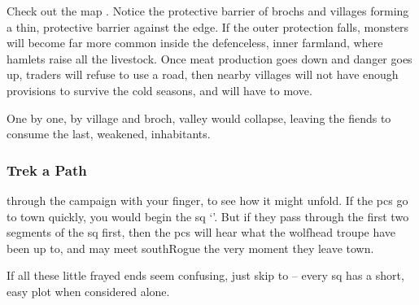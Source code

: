 \begin{multicols}{2}
Check out the map .
Notice the protective barrier of \glspl{broch} and \glspl{village} forming a thin, protective barrier against the \gls{edge}.
If the outer protection falls, \glspl{monster} will become far more common inside the defenceless, inner farmland, where hamlets raise all the livestock.
Once meat production goes down and danger goes up, traders will refuse to use a road, then nearby \glspl{village} will not have enough provisions to survive the cold seasons, and will have to move.

One by one, by \gls{village} and \gls{broch}, \gls{valley} would collapse, leaving the \glspl{fiend} to consume the last, weakened, inhabitants.

\subsubsection{Trek a Path}
through the \gls{campaign} with your finger, to see how it might unfold.
If the \glspl{pc} go to town quickly, you would begin the \gls{sq} `'.
But if they pass through the first two \glspl{segment} of the  \gls{sq} first, then the \glspl{pc} will hear what the \gls{wolfhead} troupe have been up to, and may meet \gls{southRogue} the very moment they leave \gls{town}.

If all these little frayed ends seem confusing, just skip to   -- every \gls{sq} has a short, easy plot when considered alone.




\renewcommand\csComments{
  \mapCircle{16}{76}{1.7}{Dyson_Logos/bandit_camp}
  \mapCircle{35}{88}{2}{Dyson_Logos/forgotten_city}
  \mapCircle{27}{09}{2}{Dyson_Logos/qualme_temple}
  \mapCircle[4]{56}{52}{2.5}{Dyson_Logos/town}
  \mapCircle{44}{41}{2}{Dyson_Logos/redfall}
  \mapCircle{83}{09}{1.7}{Dyson_Logos/shadow_gate}
  \mapCircle{86}{45}{1.7}{Dyson_Logos/lochside}
  \draw[very thick,white] (11,0.6) -- (12,0.6) node[anchor=north]{\outline{10 Miles}} -- (13,0.6) ;
}



\end{multicols}

